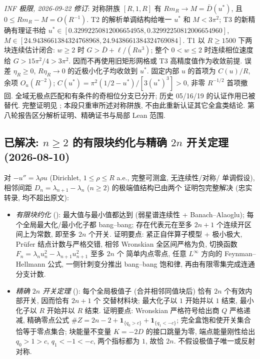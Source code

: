 \documentclass[UTF8]{ctexart}
\begin{document}
\emph{INF 极限, 2026-09-22 修订}: 对称阱族 $[R,1,R]$ 有
$Rm_R\to M=\bar D(u^*)$, 且 $0\le Rm_R-M=O(R^{-1})$.
T2 的解析单调结构给唯一 $u^*$ 和 $M<3\pi^2$; T3 的新精确有理证书给
$u^*\in[0.32992250812006654958,0.32992250812006654960]$,
$M\in[24.9438661384324768968,24.9438661384324769084]$.
T1 以 $R\ge1500$ 下两块连续估计闭合: $w\ge2$ 时
$G>\bar D+\ell/(Ru^3)$; 整个 $0<w\le2$ 时连续相位速度给
$G>15\pi^2/4>3\pi^2$. 因而不再使用旧矩形网格或 T3 高精度值作为收敛前提.
误差 $\eta_R\ge0$, $R\eta_R\to0$ 的近极小化子均收敛到 $u^*$.
固定内部 $u$ 的首项为 $C(u)/R$, 余项 $O_u(R^{-2})$;
$C(u^*)=\pi^2(1/2-u^*)/[3(u^*)^3]>0$, 非零 $R^{-1/2}$ 首项撤回.
全域无极点匹配和有条件的奇相位分支已分开; 历史 05/16/19 的认证作用已被替代.
完整证明见 ; 本段只重审所述对称阱族,
不由此重新认证其它全盒类结论. 第八轮报告区分解析证明、精确证书与局部 Lean 范围.

\subsection{已解决: \texorpdfstring{$n\ge2$}{n>=2} 的有限块约化与精确 \texorpdfstring{$2n$}{2n} 开关定理 (2026-08-10)}

对 $-u''=\lambda\rho u$ (Dirichlet, $1\le\rho\le R$ a.e., 完整可测盒, 无连续性/对称/
单调假设), 相邻间距 $D_n=\lambda_{n+1}-\lambda_n$ ($n\ge2$) 的极端值结构已由两个
证明包完整解决 (忠实转录, 均不超出原文):

\begin{itemize}
\item \emph{有限块约化} ():
最大值与最小值都达到 (弱星谱连续性 + Banach--Alaoglu); 每个全局最大化/最小化子都
bang--bang; 存在代表元在至多 $2n+1$ 个连续开区间上为常数, 即至多 $2n$ 个开关.
证明要点: 紧正自伴算子模型 + 极小极大, Pr\"ufer 结点计数与严格交错, 相邻 Wronskian
全区间严格为负, 切换函数 $F_n=\lambda_n u_n^2-\lambda_{n+1}u_{n+1}^2$ 至多 $2n$ 个
简单内点零点, 任意 $L^\infty$ 方向的 Feynman--Hellmann 公式, 一侧针刺变分推出
bang--bang 饱和律, 再由有限零集完成连通分支计数.
\item \emph{精确 $2n$ 开关定理} ():
每个全局极值子 (合并相邻同值块后) 恰有 $2n$ 个有效内部开关, 因而恰有 $2n+1$ 个
交替材料块; 最大化子以 $1$ 开始并以 $1$ 结束, 最小化子以 $R$ 开始并以 $R$ 结束.
证明要点: Wronskian 严格符号给出商 $Q$ 严格递减, 精确零点公式
$\#Z=2n-2+\mathbf 1_{\{q_0>c\}}+\mathbf 1_{\{q_1<-c\}}$; 完全盒饱和使开关集合
恰等于零点集合; 块能量不变量 $K=-2D$ 的接口跳量为零, 端点能量刚性给出 $q_0>1>c$,
$q_1<-1<-c$, 两个指标都为 $1$, 故恰 $2n$. 不假设极值子唯一或反射对称.
\end{itemize}
\end{document}
